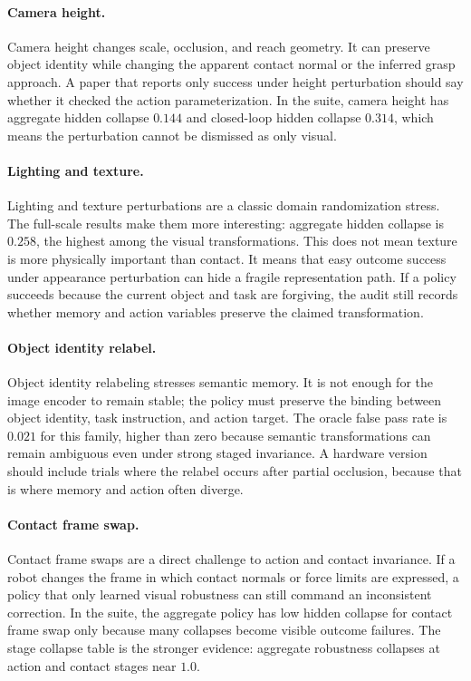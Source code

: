 \documentclass{article}
\begin{document}
\paragraph{Camera height.}
Camera height changes scale, occlusion, and reach geometry. It can preserve object identity while changing the apparent contact normal or the inferred grasp approach. A paper that reports only success under height perturbation should say whether it checked the action parameterization. In the suite, camera height has aggregate hidden collapse $0.144$ and closed-loop hidden collapse $0.314$, which means the perturbation cannot be dismissed as only visual.

\paragraph{Lighting and texture.}
Lighting and texture perturbations are a classic domain randomization stress. The full-scale results make them more interesting: aggregate hidden collapse is $0.258$, the highest among the visual transformations. This does not mean texture is more physically important than contact. It means that easy outcome success under appearance perturbation can hide a fragile representation path. If a policy succeeds because the current object and task are forgiving, the audit still records whether memory and action variables preserve the claimed transformation.

\paragraph{Object identity relabel.}
Object identity relabeling stresses semantic memory. It is not enough for the image encoder to remain stable; the policy must preserve the binding between object identity, task instruction, and action target. The oracle false pass rate is $0.021$ for this family, higher than zero because semantic transformations can remain ambiguous even under strong staged invariance. A hardware version should include trials where the relabel occurs after partial occlusion, because that is where memory and action often diverge.

\paragraph{Contact frame swap.}
Contact frame swaps are a direct challenge to action and contact invariance. If a robot changes the frame in which contact normals or force limits are expressed, a policy that only learned visual robustness can still command an inconsistent correction. In the suite, the aggregate policy has low hidden collapse for contact frame swap only because many collapses become visible outcome failures. The stage collapse table is the stronger evidence: aggregate robustness collapses at action and contact stages near $1.0$.
\end{document}
